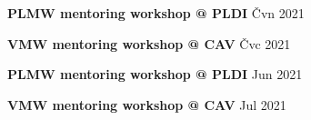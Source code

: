 \ifczech

\textbf{PLMW mentoring workshop @ PLDI} \hfill Čvn 2021 \par
\textbf{VMW mentoring workshop @ CAV} \hfill Čvc 2021 \par

\else

\textbf{PLMW mentoring workshop @ PLDI} \hfill Jun 2021 \par
\textbf{VMW mentoring workshop @ CAV} \hfill Jul 2021 \par

\fi